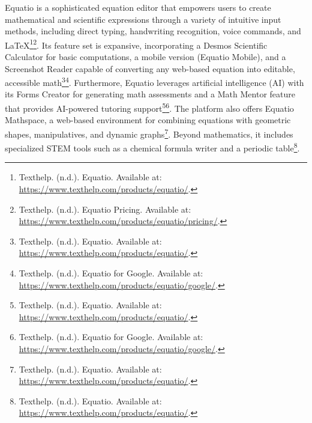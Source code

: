 Equatio is a sophisticated equation editor that empowers users to create mathematical and scientific expressions through a variety of intuitive input methods, including direct typing, handwriting recognition, voice commands, and LaTeX\footnote{Texthelp. (n.d.). Equatio. Available at: \url{https://www.texthelp.com/products/equatio/}.}\footnote{Texthelp. (n.d.). Equatio Pricing. Available at: \url{https://www.texthelp.com/products/equatio/pricing/}.}. Its feature set is expansive, incorporating a Desmos Scientific Calculator for basic computations, a mobile version (Equatio Mobile), and a Screenshot Reader capable of converting any web-based equation into editable, accessible math\footnote{Texthelp. (n.d.). Equatio. Available at: \url{https://www.texthelp.com/products/equatio/}.}\footnote{Texthelp. (n.d.). Equatio for Google. Available at: \url{https://www.texthelp.com/products/equatio/google/}.}. Furthermore, Equatio leverages artificial intelligence (AI) with its Forms Creator for generating math assessments and a Math Mentor feature that provides AI-powered tutoring support\footnote{Texthelp. (n.d.). Equatio. Available at: \url{https://www.texthelp.com/products/equatio/}.}\footnote{Texthelp. (n.d.). Equatio for Google. Available at: \url{https://www.texthelp.com/products/equatio/google/}.}. The platform also offers Equatio Mathspace, a web-based environment for combining equations with geometric shapes, manipulatives, and dynamic graphs\footnote{Texthelp. (n.d.). Equatio. Available at: \url{https://www.texthelp.com/products/equatio/}.}. Beyond mathematics, it includes specialized STEM tools such as a chemical formula writer and a periodic table\footnote{Texthelp. (n.d.). Equatio. Available at: \url{https://www.texthelp.com/products/equatio/}.}.

